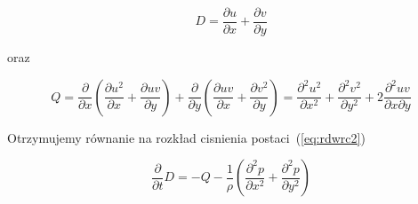 \documentclass[a4paper,10pt]{article}
\begin{document}
	\begin{equation}
		D = \frac{\partial u}{\partial x} + \frac{\partial v}{\partial y}
	\end{equation}

	oraz

	\begin{equation}
		Q = \frac{\partial}{\partial x} \left (  \frac{\partial u^2}{\partial x} + \frac{\partial uv}{\partial y} \right )
		+ \frac{\partial}{\partial y} \left (  \frac{\partial uv}{\partial x} + \frac{\partial v^2}{\partial y} \right )
		= \frac{\partial^2 u^2}{\partial x^2} + \frac{\partial^2 v^2}{\partial y^2} + 2\frac{\partial^2 uv}{\partial x\partial y}
	\end{equation}

	Otrzymujemy równanie na rozkład cisnienia postaci~(\ref{eq:rdwrc2})

	\begin{equation}
		\label{eq:rdwrc2}
		\frac{\partial}{\partial t}D = -Q - \frac{1}{\rho} \left ( \frac{\partial^2 p}{\partial x^2} + \frac{\partial^2 p}{\partial y^2} \right )
	\end{equation}
	
\end{document}
